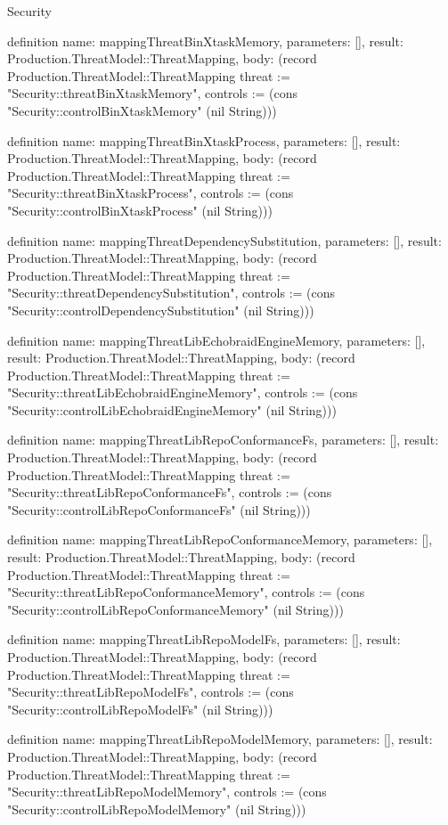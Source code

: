 \begin{lexlean}{Security}
\begin{semanticmodule}
definition{
  name: mappingThreatBinXtaskMemory,
  parameters: [],
  result: Production.ThreatModel::ThreatMapping,
  body: (record Production.ThreatModel::ThreatMapping {threat := "Security::threatBinXtaskMemory", controls := (cons "Security::controlBinXtaskMemory" (nil String))})
}

definition{
  name: mappingThreatBinXtaskProcess,
  parameters: [],
  result: Production.ThreatModel::ThreatMapping,
  body: (record Production.ThreatModel::ThreatMapping {threat := "Security::threatBinXtaskProcess", controls := (cons "Security::controlBinXtaskProcess" (nil String))})
}

definition{
  name: mappingThreatDependencySubstitution,
  parameters: [],
  result: Production.ThreatModel::ThreatMapping,
  body: (record Production.ThreatModel::ThreatMapping {threat := "Security::threatDependencySubstitution", controls := (cons "Security::controlDependencySubstitution" (nil String))})
}

definition{
  name: mappingThreatLibEchobraidEngineMemory,
  parameters: [],
  result: Production.ThreatModel::ThreatMapping,
  body: (record Production.ThreatModel::ThreatMapping {threat := "Security::threatLibEchobraidEngineMemory", controls := (cons "Security::controlLibEchobraidEngineMemory" (nil String))})
}

definition{
  name: mappingThreatLibRepoConformanceFs,
  parameters: [],
  result: Production.ThreatModel::ThreatMapping,
  body: (record Production.ThreatModel::ThreatMapping {threat := "Security::threatLibRepoConformanceFs", controls := (cons "Security::controlLibRepoConformanceFs" (nil String))})
}

definition{
  name: mappingThreatLibRepoConformanceMemory,
  parameters: [],
  result: Production.ThreatModel::ThreatMapping,
  body: (record Production.ThreatModel::ThreatMapping {threat := "Security::threatLibRepoConformanceMemory", controls := (cons "Security::controlLibRepoConformanceMemory" (nil String))})
}

definition{
  name: mappingThreatLibRepoModelFs,
  parameters: [],
  result: Production.ThreatModel::ThreatMapping,
  body: (record Production.ThreatModel::ThreatMapping {threat := "Security::threatLibRepoModelFs", controls := (cons "Security::controlLibRepoModelFs" (nil String))})
}

definition{
  name: mappingThreatLibRepoModelMemory,
  parameters: [],
  result: Production.ThreatModel::ThreatMapping,
  body: (record Production.ThreatModel::ThreatMapping {threat := "Security::threatLibRepoModelMemory", controls := (cons "Security::controlLibRepoModelMemory" (nil String))})
}
\end{semanticmodule}
\end{lexlean}
